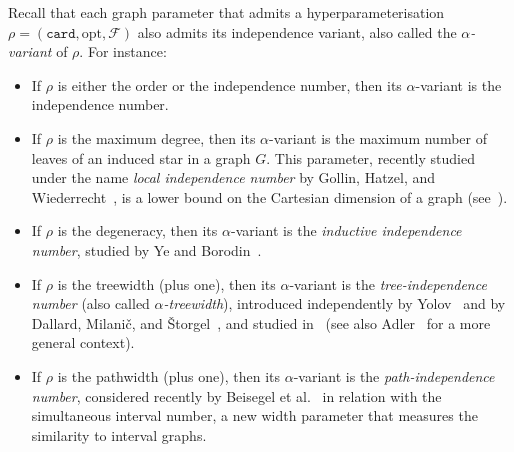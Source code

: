 \documentclass[11pt]{article}
\newcommand{\opt}{\mathrm{opt}}
\theoremstyle{plain}
\theoremstyle{definition}
\theoremstyle{remark}
\numberwithin{equation}{section}
\begin{document}
Recall that each graph parameter that admits a hyperparameterisation $\rho = (\mathtt{card},\opt, \mathcal{F})$ also admits its independence variant, also called the \emph{$\alpha$-variant} of $\rho$.
For instance:
\begin{itemize}
    \item If $\rho$ is either the order or the independence number, then its $\alpha$-variant is the independence number.
    
    \item If $\rho$ is the maximum degree, then its $\alpha$-variant is the maximum number of leaves of an induced star in a graph $G$.
    This parameter, recently studied under the name \emph{local independence number} by Gollin, Hatzel, and Wiederrecht~\cite{gollin2025graphssimplestructuremaximal}, is a lower bound on the Cartesian dimension of a graph (see~\cite{DBLP:conf/mfcs/MilanicMM17}).

    \item If $\rho$ is the degeneracy, then its $\alpha$-variant is the \emph{inductive independence number}, studied by Ye and Borodin~\cite{MR2916349}.

    \item If $\rho$ is the treewidth (plus one), then its $\alpha$-variant is the \emph{tree-independence number} (also called \emph{$\alpha$-treewidth}), introduced independently by Yolov~\cite{MR3775804} and by Dallard, Milani{\v c}, and {\v S}torgel~\cite{dallard2022firstpaper,dallard2022secondpaper}, and studied  in~\cite{DBLP:conf/soda/AhnGHK25,DFGKM25,LMMORS24,chudnovsky2025treeindependencenumbervithetas,chudnovsky2025treewidthcliqueboundednesspolylogarithmictreeindependence,CT24,gollin2025graphssimplestructuremaximal,abrishami2023tree,chudnovsky2025treeindependencenumberv,DKKMMSW2024,HMV25,chudnovsky2025treeindependencenumberivsoda,chudnovsky2024treeindependencenumberiii,MR4955546}
   (see also Adler~\cite{adler2006width} for a more general context).

   \item If $\rho$ is the pathwidth (plus one), then its $\alpha$-variant is the \emph{path-independence number}, considered recently by Beisegel et al.~\cite{beisegel_et_al:LIPIcs.SWAT.2024.7} in relation with the simultaneous interval number, a new width parameter that measures the similarity to interval graphs.
\end{itemize}
\end{document}

